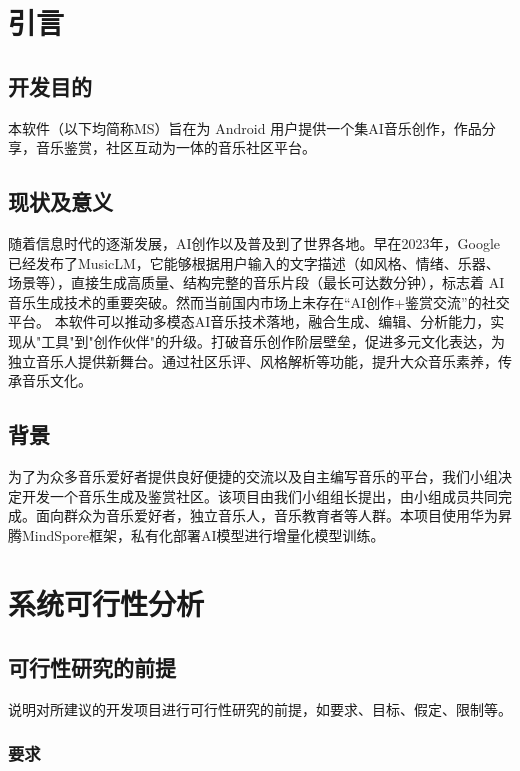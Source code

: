 \documentclass{base}
\begin{document}
\newpage
\tableofcontents

\section{引言}

\subsection{开发目的}

本软件（以下均简称MS）旨在为 Android 用户提供一个集AI音乐创作，作品分享，音乐鉴赏，社区互动为一体的音乐社区平台。

\subsection{现状及意义}

随着信息时代的逐渐发展，AI创作以及普及到了世界各地。早在2023年，Google已经发布了MusicLM，它能够根据用户输入的文字描述（如风格、情绪、乐器、场景等），直接生成高质量、结构完整的音乐片段（最长可达数分钟），标志着 AI 音乐生成技术的重要突破。然而当前国内市场上未存在“AI创作+鉴赏交流”的社交平台。
本软件可以推动多模态AI音乐技术落地，融合生成、编辑、分析能力，实现从"工具"到"创作伙伴"的升级。打破音乐创作阶层壁垒，促进多元文化表达，为独立音乐人提供新舞台。通过社区乐评、风格解析等功能，提升大众音乐素养，传承音乐文化。

\subsection{背景}

为了为众多音乐爱好者提供良好便捷的交流以及自主编写音乐的平台，我们小组决定开发一个音乐生成及鉴赏社区。该项目由我们小组组长提出，由小组成员共同完成。面向群众为音乐爱好者，独立音乐人，音乐教育者等人群。本项目使用华为昇腾MindSpore框架，私有化部署AI模型进行增量化模型训练。

\section{系统可行性分析}
\subsection{可行性研究的前提}

说明对所建议的开发项目进行可行性研究的前提，如要求、目标、假定、限制等。

\subsubsection{要求}
\end{document}
